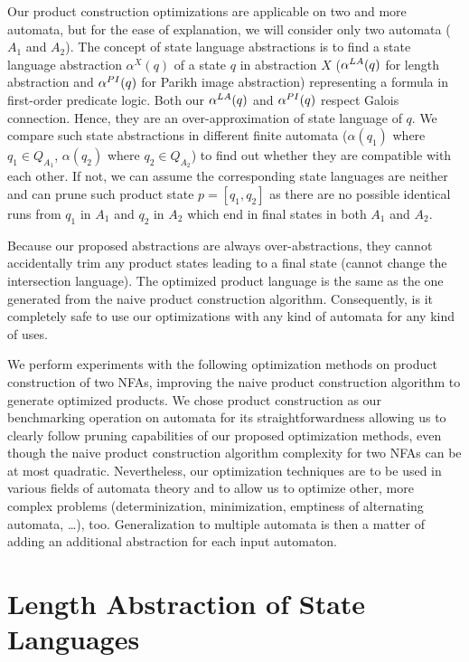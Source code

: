 Our product construction optimizations are applicable on two and more automata, but for the ease of explanation, we will consider only two automata ($A_1$ and $A_2$). The concept of state language abstractions is to find a state language abstraction $\alpha^X(q)$ of a state $q$ in abstraction $X$ ($\alpha^{LA}(q)$ for length abstraction and $\alpha^{PI}(q)$ for Parikh image abstraction) representing a formula in first-order predicate logic. Both our $\alpha^{LA}(q)$ and $\alpha^{PI}(q)$ respect Galois connection. Hence, they are an over-approximation of state language of $q$. We compare such state abstractions in different finite automata ($\alpha(q_1)$ where $q_1 \in Q_{A_1}$, $\alpha(q_2)$ where $q_2 \in Q_{A_2}$) to find out whether they are compatible with each other. If not, we can assume the corresponding state languages are neither and can prune such product state $p = [q_1, q_2]$ as there are no possible identical runs from $q_1$ in $A_1$ and $q_2$ in $A_2$ which end in final states in both $A_1$ and $A_2$.

Because our proposed abstractions are always over-abstractions, they cannot accidentally trim any product states leading to a final state (cannot change the intersection language). The optimized product language is the same as the one generated from the naive product construction algorithm. Consequently, is it completely safe to use our optimizations with any kind of automata for any kind of uses.

We perform experiments with the following optimization methods on product construction of two NFAs, improving the naive product construction algorithm to generate optimized products. We chose product construction as our benchmarking operation on automata for its straightforwardness allowing us to clearly follow pruning capabilities of our proposed optimization methods, even though the naive product construction algorithm complexity for two NFAs can be at most quadratic. Nevertheless, our optimization techniques are to be used in various fields of automata theory and to allow us to optimize other, more complex problems (determinization, minimization, emptiness of alternating automata, \ldots), too. Generalization to multiple automata is then a matter of adding an additional abstraction for each input automaton.


\section{Length Abstraction of State Languages}

